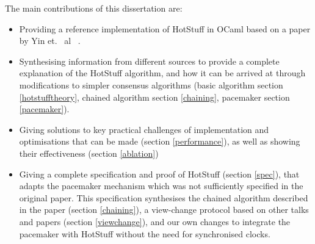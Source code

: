 The main contributions of this dissertation are:
\begin{itemize}
	\item Providing a reference implementation of HotStuff in OCaml based on a paper by Yin et. ~al~ \cite{yin2019hotstuff}.
	\item Synthesising information from different sources to provide a complete explanation of the HotStuff algorithm, and how it can be arrived at through modifications to simpler consensus algorithms (basic algorithm section \ref{hotstufftheory}, chained algorithm section \ref{chaining}, pacemaker section \ref{pacemaker}).
	\item Giving solutions to key practical challenges of implementation and optimisations that can be made (section \ref{performance}), as well as showing their effectiveness (section \ref{ablation})
	\item Giving a complete specification and proof of HotStuff (section \ref{spec}), that adapts the pacemaker mechanism which was not sufficiently specified in the original paper. This specification synthesises the chained algorithm described in the paper (section \ref{chaining}), a view-change protocol based on other talks and papers (section \ref{viewchange}), and our own changes to integrate the pacemaker with HotStuff without the need for synchronised clocks.
\end{itemize}

